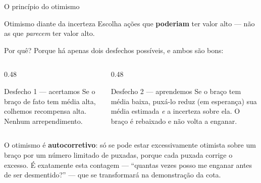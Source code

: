 \documentclass[aspectratio=169, 10pt]{beamer}
\begin{document}
\begin{frame}{O princípio do otimismo}
  \begin{defbox}{Otimismo diante da incerteza}
    Escolha ações que \textbf{poderiam} ter valor alto --- não as que
    \emph{parecem} ter valor alto.
  \end{defbox}

  \pause
  Por quê? Porque há apenas dois desfechos possíveis, e ambos são bons:

  \begin{columns}[T]
    \begin{column}{0.48\textwidth}
      \begin{teobox}{Desfecho 1 --- acertamos}
        Se o braço de fato tem média alta, colhemos recompensa alta.
        Nenhum arrependimento.
      \end{teobox}
    \end{column}
    \begin{column}{0.48\textwidth}
      \begin{teobox}{Desfecho 2 --- aprendemos}
        Se o braço tem média baixa, puxá-lo reduz (em esperança) sua média
        estimada \emph{e} a incerteza sobre ela. O braço é rebaixado e não
        volta a enganar.
      \end{teobox}
    \end{column}
  \end{columns}

  \pause
  \begin{ideiabox}
    O otimismo é \textbf{autocorretivo}: só se pode estar
    excessivamente otimista sobre um braço por um número limitado de
    puxadas, porque cada puxada corrige o excesso. É exatamente esta
    contagem --- ``quantas vezes posso me enganar antes de ser
    desmentido?'' --- que se transformará na demonstração da cota.
  \end{ideiabox}
\end{frame}
\end{document}
